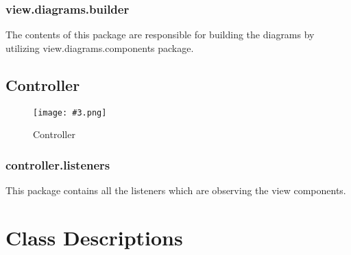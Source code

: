 \documentclass[10pt,a4paper]{report}
\newcommand{\includeimage}[5]{
    \begin{figure}[H]
        #1
        \texttt{[image: \#3.png]}
        \caption{#4}
        \label{fig:#5}
    \end{figure}
}
\begin{document}
    \subsection{view.diagrams.builder}
    The contents of this package are responsible for building the diagrams by utilizing view.diagrams.components package.
    \section{Controller}
    \includeimage{}{0.062}{Controllerv}{Controller}{ControllerFirst}
    \subsection{controller.listeners}
    This package contains all the listeners which are observing the view components.

\chapter{Class Descriptions}
\end{document}
